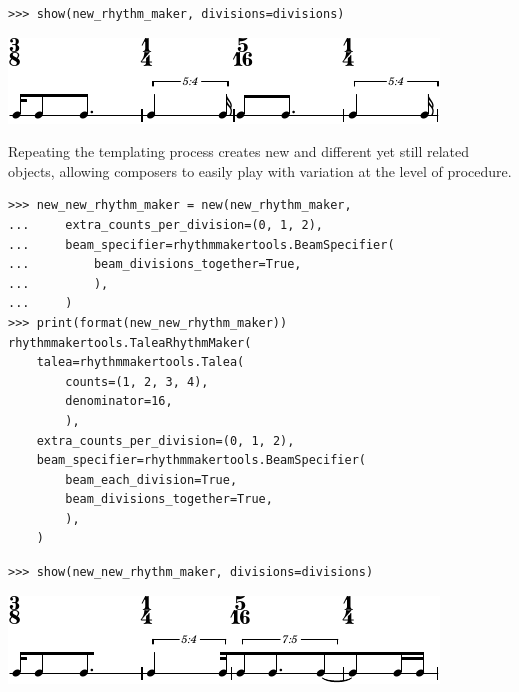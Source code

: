 \documentclass{article}
\begin{document}

\begin{lstlisting}
>>> show(new_rhythm_maker, divisions=divisions)
\end{lstlisting}
\includegraphics{assets/lilypond-a769357ad75c64d981f789b0e3a0f4da.pdf}

Repeating the templating process creates new and different yet still related
objects, allowing composers to easily play with variation at the level of
procedure.

\begin{lstlisting}
>>> new_new_rhythm_maker = new(new_rhythm_maker,
...     extra_counts_per_division=(0, 1, 2),
...     beam_specifier=rhythmmakertools.BeamSpecifier(
...         beam_divisions_together=True,
...         ),
...     )
>>> print(format(new_new_rhythm_maker))
rhythmmakertools.TaleaRhythmMaker(
    talea=rhythmmakertools.Talea(
        counts=(1, 2, 3, 4),
        denominator=16,
        ),
    extra_counts_per_division=(0, 1, 2),
    beam_specifier=rhythmmakertools.BeamSpecifier(
        beam_each_division=True,
        beam_divisions_together=True,
        ),
    )
\end{lstlisting}

\begin{lstlisting}
>>> show(new_new_rhythm_maker, divisions=divisions)
\end{lstlisting}
\includegraphics{assets/lilypond-23e2752f7db7cf02e31cf8e9f399c5b6.pdf}
\end{document}
